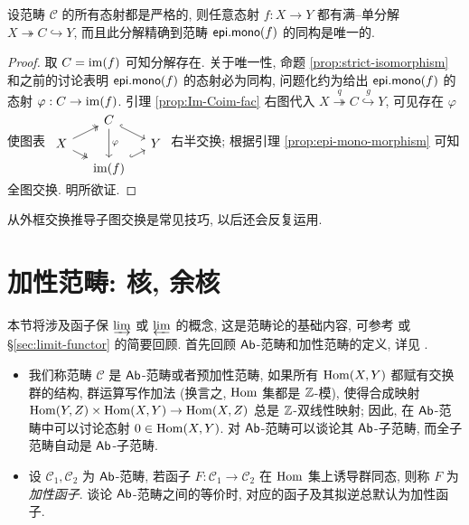 \begin{proposition}\label{prop:epi-mono-uniqueness}
	设范畴 $\mathcal{C}$ 的所有态射都是严格的, 则任意态射 $f: X \to Y$ 都有满--单分解 $X \twoheadrightarrow C \hookrightarrow Y$, 而且此分解精确到范畴 $\mathsf{epi.mono}(f)$ 的同构是唯一的.
\end{proposition}
\begin{proof}
	取 $C = \operatorname{im}(f)$ 可知分解存在. 关于唯一性, 命题 \ref{prop:strict-isomorphism} 和之前的讨论表明 $\mathsf{epi.mono}(f)$ 的态射必为同构, 问题化约为给出 $\mathsf{epi.mono}(f)$ 的态射 $\varphi: C \to \operatorname{im}(f)$. 引理 \ref{prop:Im-Coim-fac} 右图代入 $X \stackrel{q}{\twoheadrightarrow} C \stackrel{g}{\hookrightarrow} Y$, 可见存在 $\varphi$ 使图表
	$\begin{tikzcd}[row sep=tiny, column sep=small]
		& C \arrow[hookrightarrow, rd] \arrow[dd, "\varphi"] & \\
		X \arrow[twoheadrightarrow, ru] \arrow[twoheadrightarrow, rd] & & Y \\
		& \Image(f) \arrow[hookrightarrow, ru] &
	\end{tikzcd}$
	右半交换; 根据引理 \ref{prop:epi-mono-morphism} 可知全图交换. 明所欲证.
\end{proof}

从外框交换推导子图交换是常见技巧, 以后还会反复运用.

\section{加性范畴: 核, 余核}\label{sec:Ker-Coker}
本节将涉及函子保 $\varinjlim$ 或 $\varprojlim$ 的概念, 这是范畴论的基础内容, 可参考 \cite[定义 2.8.8]{Li1} 或 \S\ref{sec:limit-functor} 的简要回顾. 首先回顾 $\mathsf{Ab}$-范畴和加性范畴的定义, 详见 \cite[\S 3.4]{Li1}.

\begin{itemize}
	\item 我们称范畴 $\mathcal{C}$ 是 $\mathsf{Ab}$-范畴或者预加性范畴, 如果所有 $\operatorname{Hom}(X, Y)$ 都赋有交换群的结构, 群运算写作加法 (换言之, $\operatorname{Hom}$ 集都是 $\mathbb{Z}$-模), 使得合成映射 $\operatorname{Hom}(Y, Z) \times \operatorname{Hom}(X, Y) \to \operatorname{Hom}(X, Z)$ 总是 $\mathbb{Z}$-双线性映射; 因此, 在 $\mathsf{Ab}$-范畴中可以讨论态射 $0 \in \operatorname{Hom}(X, Y)$. 对 $\mathsf{Ab}$-范畴可以谈论其 $\mathsf{Ab}$-子范畴, 而全子范畴自动是 $\mathsf{Ab}$-子范畴.

	\item 设 $\mathcal{C}_1, \mathcal{C}_2$ 为 $\mathsf{Ab}$-范畴, 若函子 $F: \mathcal{C}_1 \to \mathcal{C}_2$ 在 $\operatorname{Hom}$ 集上诱导群同态, 则称 $F$ 为\emph{加性函子}. 谈论 $\mathsf{Ab}$-范畴之间的等价时, 对应的函子及其拟逆总默认为加性函子.
\end{itemize}

